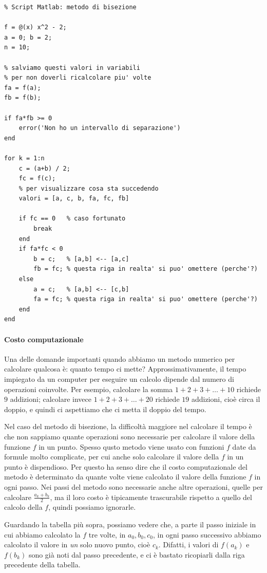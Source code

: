 \documentclass[a4paper]{report}
\theoremstyle{definition}
\theoremstyle{remark}
\begin{document}
\begin{lstlisting}
% Script Matlab: metodo di bisezione

f = @(x) x^2 - 2;
a = 0; b = 2;
n = 10;

% salviamo questi valori in variabili
% per non doverli ricalcolare piu' volte
fa = f(a); 
fb = f(b);

if fa*fb >= 0
    error('Non ho un intervallo di separazione')
end

for k = 1:n
    c = (a+b) / 2;
    fc = f(c);
    % per visualizzare cosa sta succedendo
    valori = [a, c, b, fa, fc, fb]

    if fc == 0   % caso fortunato
        break
    end
    if fa*fc < 0
        b = c;   % [a,b] <-- [a,c]
        fb = fc; % questa riga in realta' si puo' omettere (perche'?)
    else
        a = c;   % [a,b] <-- [c,b]
        fa = fc; % questa riga in realta' si puo' omettere (perche'?)
    end
end
\end{lstlisting}


\paragraph{Costo computazionale} Una delle domande importanti quando abbiamo un metodo numerico per calcolare qualcosa è: quanto tempo ci mette? Approssimativamente, il tempo impiegato da un computer per eseguire un calcolo dipende dal numero di operazioni coinvolte. Per esempio, calcolare la somma $1+2+3+\dots+10$ richiede $9$ addizioni; calcolare invece $1+2+3+\dots+20$ richiede $19$ addizioni, cioè circa il doppio, e quindi ci aspettiamo che ci metta il doppio del tempo.

Nel caso del metodo di bisezione, la difficoltà maggiore nel calcolare il tempo è che non sappiamo quante operazioni sono necessarie per calcolare il valore della funzione $f$ in un punto. Spesso qusto metodo viene usato con funzioni $f$ date da formule molto complicate, per cui anche solo calcolare il valore della $f$ in un punto è dispendioso. Per questo ha senso dire che il costo computazionale del metodo è determinato da quante volte viene calcolato il valore della funzione $f$ in ogni passo. Nei passi del metodo sono necessarie anche altre operazioni, quelle per calcolare $\frac{a_k+b_k}{2}$, ma il loro costo è tipicamente trascurabile rispetto a quello del calcolo della $f$, quindi possiamo ignorarle.

Guardando la tabella più sopra, possiamo vedere che, a parte il passo iniziale in cui abbiamo calcolato la $f$ tre volte, in $a_0,b_0,c_0$, in ogni passo successivo abbiamo calcolato il valore in \emph{un} solo nuovo punto, cioè $c_k$. Difatti, i valori di $f(a_k)$ e $f(b_k)$ sono già noti dal passo precedente, e ci è bastato ricopiarli dalla riga precedente della tabella.
\end{document}
